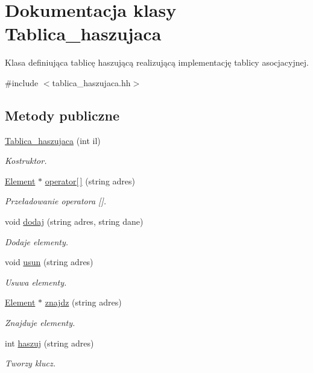 \hypertarget{class_tablica__haszujaca}{\section{\-Dokumentacja klasy \-Tablica\-\_\-haszujaca}
\label{class_tablica__haszujaca}
}


\-Klasa definiująca tablicę haszującą realizującą implementację tablicy asocjacyjnej.  




{\ttfamily \#include $<$tablica\-\_\-haszujaca.\-hh$>$}

\subsection*{\-Metody publiczne}
\begin{DoxyCompactItemize}
\item 
\hyperlink{class_tablica__haszujaca_a10787b7333fcb7fe360ba89854b3351f}{\-Tablica\-\_\-haszujaca} (int il)
\begin{DoxyCompactList}\small\item\em \-Kostruktor. \end{DoxyCompactList}\item 
\hyperlink{class_element}{\-Element} $\ast$ \hyperlink{class_tablica__haszujaca_a7d0fee5b9be90c0403d74821706eaa65}{operator\mbox{[}$\,$\mbox{]}} (string adres)
\begin{DoxyCompactList}\small\item\em \-Przeładowanie operatora \mbox{[}\mbox{]}. \end{DoxyCompactList}\item 
void \hyperlink{class_tablica__haszujaca_af7f6a8c598a22328c585c849754492b7}{dodaj} (string adres, string dane)
\begin{DoxyCompactList}\small\item\em \-Dodaje elementy. \end{DoxyCompactList}\item 
void \hyperlink{class_tablica__haszujaca_afc4feffb08feba48c17f72af2f43bf03}{usun} (string adres)
\begin{DoxyCompactList}\small\item\em \-Usuwa elementy. \end{DoxyCompactList}\item 
\hyperlink{class_element}{\-Element} $\ast$ \hyperlink{class_tablica__haszujaca_ac166065397ac53014b3453543c800337}{znajdz} (string adres)
\begin{DoxyCompactList}\small\item\em \-Znajduje elementy. \end{DoxyCompactList}\item 
int \hyperlink{class_tablica__haszujaca_ac8dbd2993ea46777b616a8b3a0fc20a3}{haszuj} (string adres)
\begin{DoxyCompactList}\small\item\em \-Tworzy klucz. \end{DoxyCompactList}\end{DoxyCompactItemize}
